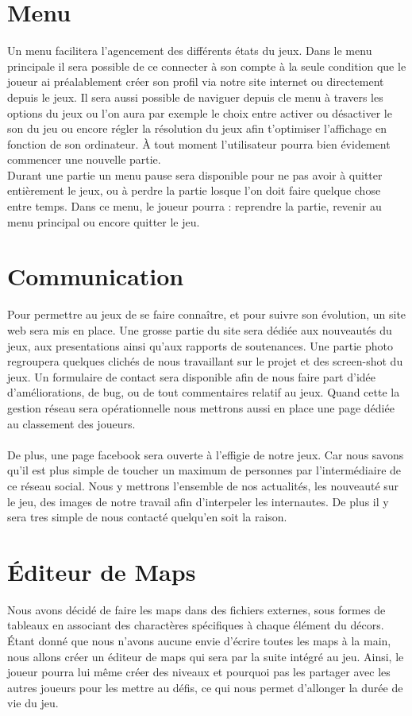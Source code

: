 \documentclass [11pt]{report}
\begin{document}
	\section {Menu}
	Un menu facilitera l'agencement des différents états du jeux. Dans le menu principale il sera possible de ce connecter à son compte à la seule condition que le joueur ai préalablement créer son profil via notre site internet ou directement depuis le jeux. Il sera aussi possible de naviguer depuis cle menu à travers les options du jeux ou l'on aura par exemple le choix entre activer ou désactiver le son du jeu ou encore régler la résolution du jeux afin t'optimiser l'affichage en fonction de son ordinateur. \`A tout moment l'utilisateur pourra bien évidement commencer une nouvelle partie. \\
\indent Durant une partie un menu pause sera disponible pour ne pas avoir à quitter entièrement le jeux, ou à perdre la partie losque l'on doit faire quelque chose entre temps. Dans ce menu, le joueur pourra : reprendre la partie, revenir au menu principal ou encore quitter le jeu.\\\vspace{5mm}


	\section {Communication}
	Pour permettre au jeux de se faire conna\^itre, et pour suivre son \'evolution, un site web sera mis en place. Une grosse partie du site sera dédiée aux nouveautés du jeux, aux presentations ainsi qu'aux rapports de soutenances. Une partie photo regroupera quelques clichés de nous travaillant sur le projet et des screen-shot du jeux. Un formulaire de contact sera disponible afin de nous faire part d'idée d'am\'eliorations, de bug, ou de tout commentaires relatif au jeux. Quand cette la gestion réseau sera opérationnelle nous mettrons aussi en place une page dédiée au classement des joueurs.
\\\\ \indent
	De plus, une page facebook sera ouverte à l'effigie de notre jeux. Car nous savons qu'il est plus simple de toucher un maximum de personnes par l'intermédiaire de ce réseau social. Nous y mettrons l'ensemble de nos actualités, les nouveauté sur le jeu, des images de notre travail afin d'interpeler les internautes. De plus il y sera tres simple de nous contacté quelqu'en soit la raison.

	\section {\'Editeur de Maps}
	Nous avons décidé de faire les maps dans des fichiers externes, sous formes de tableaux en associant des charactères spécifiques à chaque élément du décors. \'Etant donné que nous n'avons aucune envie d'écrire toutes les maps à la main, nous allons créer un éditeur de maps qui sera par la suite intégré au jeu. Ainsi, le joueur pourra lui même créer des niveaux et pourquoi pas les partager avec les autres joueurs pour les mettre au défis, ce qui nous permet d'allonger la durée de vie du jeu.\\\vspace{5mm}
\end{document}
